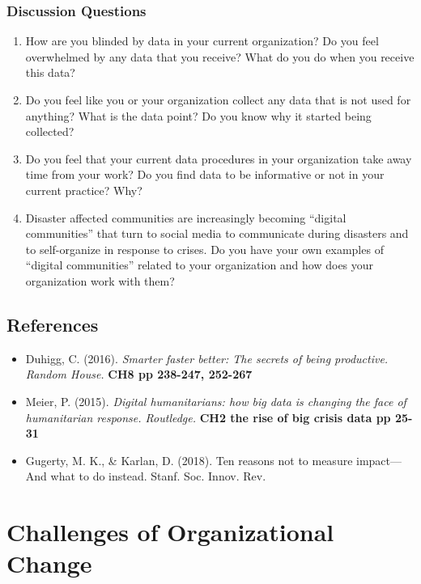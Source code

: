 \documentclass[]{book}
\providecommand{\tightlist}{%
  \setlength{\itemsep}{0pt}\setlength{\parskip}{0pt}}
\begin{document}
\hypertarget{discussion-questions-1}{%
\subsection{Discussion Questions}\label{discussion-questions-1}}

\begin{enumerate}
\def\labelenumi{\arabic{enumi}.}
\item
  How are you blinded by data in your current organization? Do you feel overwhelmed by any data that you receive? What do you do when you receive this data?
\item
  Do you feel like you or your organization collect any data that is not used for anything? What is the data point? Do you know why it started being collected?
\item
  Do you feel that your current data procedures in your organization take away time from your work? Do you find data to be informative or not in your current practice? Why?
\item
  Disaster affected communities are increasingly becoming ``digital communities'' that turn to social media to communicate during disasters and to self-organize in response to crises. Do you have your own examples of ``digital communities'' related to your organization and how does your organization work with them?
\end{enumerate}

\hypertarget{references-1}{%
\section{References}\label{references-1}}

\begin{itemize}
\tightlist
\item
  Duhigg, C. (2016). \emph{Smarter faster better: The secrets of being productive. Random House.} \textbf{CH8 pp 238-247, 252-267}
\item
  Meier, P. (2015). \emph{Digital humanitarians: how big data is changing the face of humanitarian response. Routledge.} \textbf{CH2 the rise of big crisis data pp 25-31}\\
\item
  Gugerty, M. K., \& Karlan, D. (2018). Ten reasons not to measure impact---And what to do instead. Stanf. Soc. Innov. Rev.
\end{itemize}

\hypertarget{challenges-of-organizational-change}{%
\chapter{Challenges of Organizational Change}\label{challenges-of-organizational-change}}
\end{document}

